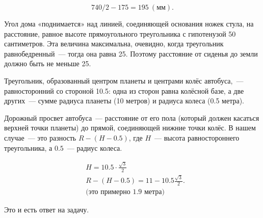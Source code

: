 \begin{itemize}

\itA $$740/2-175 = \SI{195}{(\text{мм})}.$$

\itB Угол дома «поднимается» над линией, соединяющей основания ножек стула, на расстояние, равное высоте прямоугольного треугольника с гипотенузой 50 сантиметров. Эта величина максимальна, очевидно, когда треугольник равнобедренный~— тогда она равна \SI{25}{}. Поэтому расстояние от сиденья до земли должно быть не меньше \SI{25}{}.

\begin{center}  \end{center}

\itC Треугольник, образованный центром планеты и центрами колёс автобуса,~— равносторонний со стороной \SI{10.5}{}: одна из сторон равна колёсной базе, а две других~— сумме радиуса планеты (10 метров) и радиуса колеса (0.5 метра).

\begin{center}
\end{center}

Дорожный просвет автобуса~— расстояние от его пола (который должен касаться верхней точки планеты) до прямой, соединяющей нижние точки колёс. В нашем случае~— это разность $R-(H-0.5)$, где $H$~— высота равностороннего треугольника, а $0.5$~— радиус колеса.

\begin{align*}
	& H = 10.5 \cdot \frac{\sqrt{3}}{2} \\
	& R-(H-0.5) = 11 - 10.5\frac{\sqrt{3}}{2}. \\
	& \text{(это примерно 1.9 метра)}
\end{align*}

Это и есть ответ на задачу.
\end{itemize}